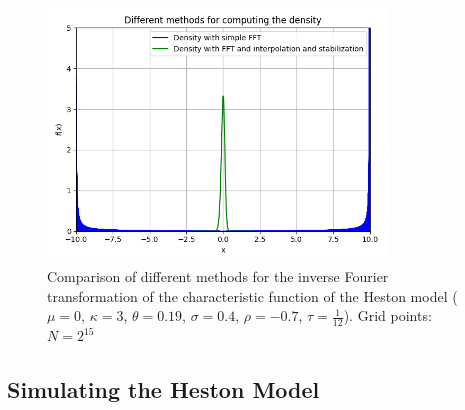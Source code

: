 \begin{figure}[h]
    \centering
    \includegraphics[width=0.8\textwidth]{img/different_ifft_methods.png}
    \caption{Comparison of different methods for the inverse Fourier transformation of the characteristic function of the Heston model ($\mu=0$, $\kappa=3$, $\theta=0.19$, $\sigma=0.4$, $\rho=-0.7$, $\tau=\frac{1}{12}$). Grid points: $N=2^{15}$}
    \label{fig:ifft_comparison}
\end{figure}

\subsection{Simulating the Heston Model}

